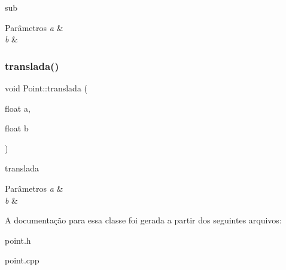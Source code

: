sub 


\begin{DoxyParams}{Parâmetros}
{\em a} & \\
\hline
{\em b} & \\
\hline
\end{DoxyParams}
\mbox{\label{class_point_ad9676e36f3444534b609e3c68422239a}} 
\subsubsection{\texorpdfstring{translada()}{translada()}}
{\footnotesize\ttfamily void Point\+::translada (\begin{DoxyParamCaption}\item[{float}]{a,  }\item[{float}]{b }\end{DoxyParamCaption})}



translada 


\begin{DoxyParams}{Parâmetros}
{\em a} & \\
\hline
{\em b} & \\
\hline
\end{DoxyParams}


A documentação para essa classe foi gerada a partir dos seguintes arquivos\+:\begin{DoxyCompactItemize}
\item 
point.\+h\item 
point.\+cpp\end{DoxyCompactItemize}
